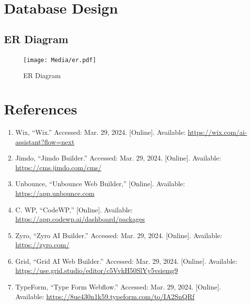 \documentclass[12pt]{report}
\begin{document}
\clearpage
\section{Database Design}

\subsection{ER Diagram}

\begin{figure}[ht]
    \centering
    \texttt{[image: Media/er.pdf]} %
    \caption{ER Diagram}
    \label{fig:drawing1}
\end{figure}
\clearpage
\section{References}

\begin{sloppypar} %
\begin{enumerate}
    \item Wix, “Wix.” Accessed: Mar. 29, 2024. [Online]. Available: \url{https://wix.com/ai-assistant?flow=next}
    \item Jimdo, “Jimdo Builder.” Accessed: Mar. 29, 2024. [Online]. Available: \url{https://cms.jimdo.com/cms/}
    \item Unbounce, “Unbounce Web Builder,” [Online]. Available: \url{https://app.unbounce.com}
    \item C. WP, “CodeWP,” [Online]. Available: \url{https://app.codewp.ai/dashboard/packages}
    \item Zyro, “Zyro AI Builder.” Accessed: Mar. 29, 2024. [Online]. Available: \url{https://zyro.com/}
    \item Grid, “Grid AI Web Builder.” Accessed: Mar. 29, 2024. [Online]. Available: \url{https://use.grid.studio/editor/c5VvkH50SlYy5vsiemg9}
    \item TypeForm, “Type Form Webflow.” Accessed: Mar. 29, 2024. [Online]. Available: \url{https://8ue430n1k59.typeform.com/to/IA2SnQRf}
\end{enumerate}
\end{sloppypar}
\end{document}
